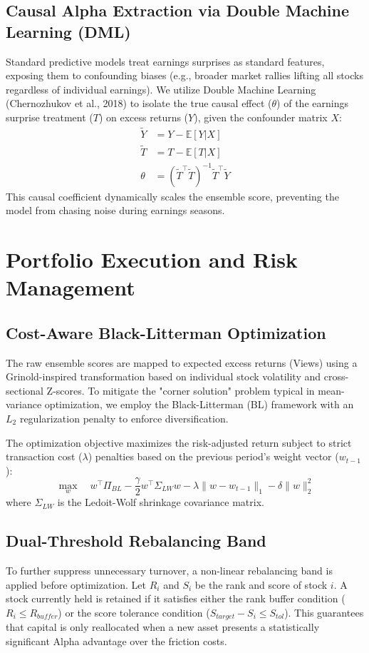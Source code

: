 \documentclass[11pt, a4paper]{article}
\begin{document}
\subsection{Causal Alpha Extraction via Double Machine Learning (DML)}
Standard predictive models treat earnings surprises as standard features, exposing them to confounding biases (e.g., broader market rallies lifting all stocks regardless of individual earnings). We utilize Double Machine Learning (Chernozhukov et al., 2018) to isolate the true causal effect ($\theta$) of the earnings surprise treatment ($T$) on excess returns ($Y$), given the confounder matrix $X$:
\begin{align}
\tilde{Y} &= Y - \mathbb{E}[Y | X] \\
\tilde{T} &= T - \mathbb{E}[T | X] \\
\theta &= (\tilde{T}^\top \tilde{T})^{-1} \tilde{T}^\top \tilde{Y}
\end{align}
This causal coefficient dynamically scales the ensemble score, preventing the model from chasing noise during earnings seasons.

\section{Portfolio Execution and Risk Management}

\subsection{Cost-Aware Black-Litterman Optimization}
The raw ensemble scores are mapped to expected excess returns (Views) using a Grinold-inspired transformation based on individual stock volatility and cross-sectional Z-scores. To mitigate the "corner solution" problem typical in mean-variance optimization, we employ the Black-Litterman (BL) framework with an $L_2$ regularization penalty to enforce diversification. 

The optimization objective maximizes the risk-adjusted return subject to strict transaction cost ($\lambda$) penalties based on the previous period's weight vector ($w_{t-1}$):
\begin{equation}
\max_{w} \quad w^\top \Pi_{BL} - \frac{\gamma}{2} w^\top \Sigma_{LW} w - \lambda \|w - w_{t-1}\|_1 - \delta \|w\|_2^2
\end{equation}
where $\Sigma_{LW}$ is the Ledoit-Wolf shrinkage covariance matrix.

\subsection{Dual-Threshold Rebalancing Band}
To further suppress unnecessary turnover, a non-linear rebalancing band is applied before optimization. Let $R_i$ and $S_i$ be the rank and score of stock $i$. A stock currently held is retained if it satisfies either the rank buffer condition ($R_i \le R_{buffer}$) or the score tolerance condition ($S_{target} - S_i \le S_{tol}$). This guarantees that capital is only reallocated when a new asset presents a statistically significant Alpha advantage over the friction costs.
\end{document}
